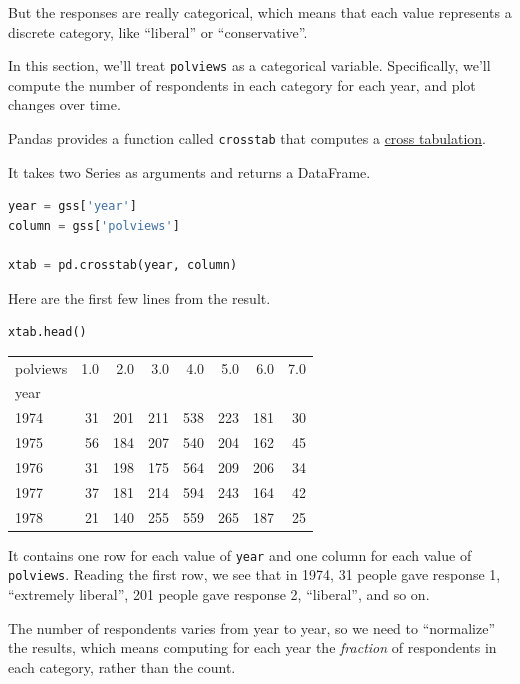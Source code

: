 But the responses are really categorical, which means that each value
represents a discrete category, like ``liberal'' or ``conservative''.

In this section, we'll treat \passthrough{\lstinline!polviews!} as a
categorical variable. Specifically, we'll compute the number of
respondents in each category for each year, and plot changes over time.

Pandas provides a function called \passthrough{\lstinline!crosstab!}
that computes a
\href{https://en.wikipedia.org/wiki/Contingency_table}{cross
tabulation}.

It takes two Series as arguments and returns a DataFrame.

\begin{lstlisting}[language=Python]
year = gss['year']
column = gss['polviews']

xtab = pd.crosstab(year, column)
\end{lstlisting}

Here are the first few lines from the result.

\begin{lstlisting}[language=Python]
xtab.head()
\end{lstlisting}

\begin{tabular}{lrrrrrrr}
\toprule
polviews &  1.0 &  2.0 &  3.0 &  4.0 &  5.0 &  6.0 &  7.0 \\
year &      &      &      &      &      &      &      \\
\midrule
1974 &   31 &  201 &  211 &  538 &  223 &  181 &   30 \\
1975 &   56 &  184 &  207 &  540 &  204 &  162 &   45 \\
1976 &   31 &  198 &  175 &  564 &  209 &  206 &   34 \\
1977 &   37 &  181 &  214 &  594 &  243 &  164 &   42 \\
1978 &   21 &  140 &  255 &  559 &  265 &  187 &   25 \\
\bottomrule
\end{tabular}

It contains one row for each value of \passthrough{\lstinline!year!} and
one column for each value of \passthrough{\lstinline!polviews!}. Reading
the first row, we see that in 1974, 31 people gave response 1,
``extremely liberal'', 201 people gave response 2, ``liberal'', and so
on.

The number of respondents varies from year to year, so we need to
``normalize'' the results, which means computing for each year the
\emph{fraction} of respondents in each category, rather than the count.

